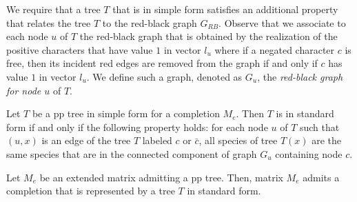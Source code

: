 \documentclass{llncs}
\begin{document}
We require that  a  tree $T$ that is in simple form  satisfies  an additional property  that relates the tree $T$ to the red-black graph  $G_{RB}$.  Observe that we associate to each node $u$ of $T$ the red-black graph that is obtained by the realization of the positive characters that have value $1$ in vector $l_u$ where if  a negated character $c$ is free, then its incident red edges are removed from the graph  if and only if  $c$  has value $1$ in vector $l_u$. We define such a graph, denoted as $G_u$, the {\em red-black graph for node $u$} of $T$.




\begin{definition} 
\label{standard}
Let $T$ be a pp tree  in simple form for a completion $M_e$. Then $T$ is in standard form if and only if the following property holds:
for each node   $u$ of $T$ such that $(u,x)$ is an edge of the tree $T$ labeled $c$  or $\bar{c}$,    all species of tree $T(x)$ are the same species that are in the  connected component of  graph $G_u$ containing node $c$.

\end{definition}



\begin{lemma}
\label{tec1}
Let  $M_e$ be an extended matrix admitting a pp tree. Then, matrix $M_e$ admits a completion that is represented by a tree $T$ in standard form.
\end{lemma}
\end{document}
